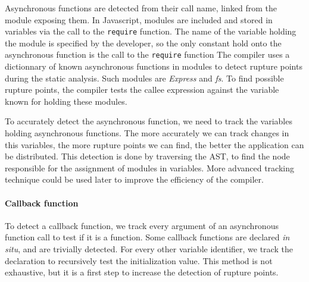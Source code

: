 Asynchronous functions are detected from their call name, linked from the module exposing them.
In Javascript, modules are included and stored in variables via the call to the \texttt{require} function.
The name of the variable holding the module is specified by the developer, so the only constant hold onto the asynchronous function is the call to the \texttt{require} function
The compiler uses a dictionnary of known asynchronous functions in modules to detect rupture points during the static analysis.
Such modules are \textit{Express} and \textit{fs}.
To find possible rupture points, the compiler tests the callee expression against the variable known for holding these modules.

To accurately detect the asynchronous function, we need to track the variables holding asynchronous functions.
The more accurately we can track changes in this variables, the more rupture points we can find, the better the application can be distributed.
This detection is done by traversing the AST, to find the node responsible for the assignment of modules in variables.
More advanced tracking technique could be used later to improve the efficiency of the compiler.







\paragraph{Callback function}

To detect a callback function, we track every argument of an asynchronous function call to test if it is a function.
Some callback functions are declared \textit{in situ}, and are trivially detected.
For every other variable identifier, we track the declaration to recursively test the initialization value.
This method is not exhaustive, but it is a first step to increase the detection of rupture points.


